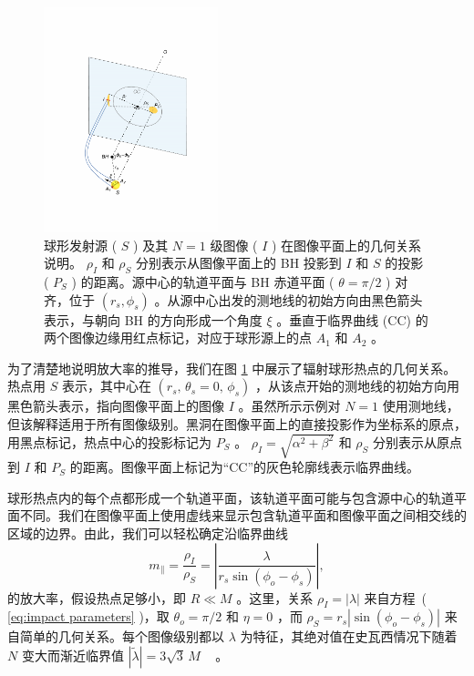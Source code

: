 \documentclass[aps,reprint,superscriptaddress,nofootinbib,floatfix,longbibliography,preprintnumbers]{revtex4-1}
\begin{document}
   \begin{figure}[!htbp]
    \centering
    \includegraphics[width=0.45\textwidth]{figures/3D_mag.pdf}
    \caption{球形发射源 (   $S$   ) 及其    $N=1$    级图像 (   $I$   ) 在图像平面上的几何关系说明。   $\rho_I$    和    $\rho_S$    分别表示从图像平面上的 BH 投影到    $I$    和    $S$    的投影 (   $P_S$   ) 的距离。源中心的轨道平面与 BH 赤道平面 (   $\theta=\pi/2$   ) 对齐，位于    $(r_s, \phi_s)$   。从源中心出发的测地线的初始方向由黑色箭头表示，与朝向 BH 的方向形成一个角度    $\xi$   。垂直于临界曲线 (CC) 的两个图像边缘用红点标记，对应于球形源上的点    $A_1$    和    $A_2$   。  }
    \label{fig:3Dmag}
\end{figure}     

为了清楚地说明放大率的推导，我们在图    \ref{fig:3Dmag}    中展示了辐射球形热点的几何关系。热点用    $S$    表示，其中心在    $(r_s,\,\theta_s = 0,\,\phi_s)$    ，从该点开始的测地线的初始方向用黑色箭头表示，指向图像平面上的图像    $I$    。虽然所示示例对    $N=1$    使用测地线，但该解释适用于所有图像级别。黑洞在图像平面上的直接投影作为坐标系的原点，用黑点标记，热点中心的投影标记为    $P_S$    。   $\rho_I = \sqrt{\alpha^2 + \beta^2}$    和    $\rho_S$    分别表示从原点到    $I$    和    $P_S$    的距离。图像平面上标记为“CC”的灰色轮廓线表示临界曲线。  

球形热点内的每个点都形成一个轨道平面，该轨道平面可能与包含源中心的轨道平面不同。我们在图像平面上使用虚线来显示包含轨道平面和图像平面之间相交线的区域的边界。由此，我们可以轻松确定沿临界曲线    \begin{equation}
    m_{\parallel}=\frac{\rho_I}{\rho_{S}}=\left|\frac{\lambda}{r_s\sin(\phi_o-\phi_s)}\right|,
    \label{eq:mpar}
\end{equation}    的放大率，假设热点足够小，即    $R \ll M$    。这里，关系    $\rho_I = \left|\lambda\right|$    来自方程~(    \ref{eq:impact parameters}    )，取    $\theta_o = \pi/2$    和    $\eta = 0$    ，而    $\rho_S = r_s \left|\sin(\phi_o - \phi_s)\right|$    来自简单的几何关系。每个图像级别都以    $\lambda$    为特征，其绝对值在史瓦西情况下随着    $N$    变大而渐近临界值    $|\tilde{\lambda}| = 3\sqrt{3}\,M$    ~    \cite{Luminet:1979nyg}   。  
\end{document}
